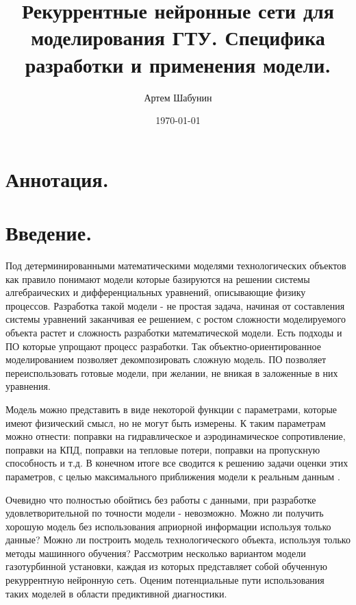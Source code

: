 \documentclass[12pt,a4paper]{article}
\title{Рекуррентные нейронные сети для моделирования ГТУ. Специфика разработки и применения модели.}
\author{Артем Шабунин}
\date{\today}
\begin{document}
	
\maketitle

\section*{Аннотация.}

\section{Введение.}

Под детерминированными математическими моделями технологических объектов как правило понимают модели которые базируются на решении системы алгебраических и дифференциальных уравнений, описывающие физику процессов. Разработка такой модели - не простая задача, начиная от составления системы уравнений заканчивая ее решением, с ростом сложности моделируемого объекта растет и сложность разработки математической модели. Есть подходы и ПО которые упрощают процесс разработки. Так объектно-ориентированное моделированием позволяет декомпозировать сложную модель. ПО позволяет переиспользовать готовые модели, при желании, не вникая в заложенные в них уравнения. 

Модель можно представить в виде некоторой функции с параметрами, которые имеют физический смысл, но не могут быть измерены. К таким параметрам можно отнести: поправки на гидравлическое и аэродинамическое сопротивление, поправки на КПД, поправки на тепловые потери, поправки на пропускную способность и т.д. В конечном итоге все сводится к решению задачи оценки этих параметров, с целью максимального приближения модели к реальным данным \cite{Bezruchko}.


Очевидно что полностью обойтись без работы с данными, при разработке удовлетворительной по точности модели - невозможно. Можно ли получить хорошую модель без использования априорной информации используя только данные? Можно ли построить модель технологического объекта, используя только методы машинного обучения?
Рассмотрим несколько вариантом модели газотурбинной установки, каждая из которых представляет собой обученную рекуррентную нейронную сеть. Оценим потенциальные пути использования таких моделей в области предиктивной диагностики.
\end{document}
